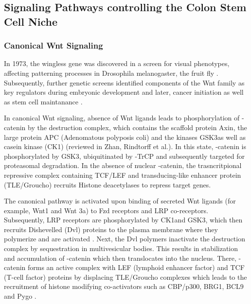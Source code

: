 \begin{flushleft}
\subsection{Signaling Pathways controlling the Colon Stem Cell Niche}
\subsubsection{Canonical Wnt Signaling}
In 1973, the wingless gene was discovered in a screen for visual phenotypes, affecting patterning processes in Drosophila melanogaster, the fruit fly \cite{Sharma1973WinglessMelanogaster.}. Subsequently, further genetic screens identified components of the Wnt family as key regulators during embryonic development and later, cancer initiation as well as stem cell maintanance  \cite{Nusslein-Volhard1980MutationsDrosophila}. \par 

In canonical Wnt signaling, absence of Wnt ligands leads to phosphorylation of \textbeta-catenin by the destruction complex, which contains the scaffold protein Axin, the large protein APC (Adenomatous polyposis coli) and the kinases GSK3\textbeta as well as casein kinase (CK1\textalpha) (reviewed in Zhan, Rindtorff et al.\cite{Zhan2017}). 
In this state, \textbeta-catenin is phosphorylated by GSK3\textbeta, ubiquitinated by \textbeta-TrCP and subsequently targeted for proteasomal degradation. 
In the absence of nuclear \textbeta-catenin, the trasncritpional repressive complex containing TCF/LEF and transducing-like enhancer protein (TLE/Groucho) recruits Histone deacetylases to repress target genes. \par 

The canonical pathway is activated upon binding of secreted Wnt ligands (for example, Wnt1 and Wnt 3a) to Fzd receptors and LRP co-receptors. 
Subsequently, LRP receptors are  phosphorylated by CK1\textalpha and GSK3\textbeta, which then recruits Dishevelled (Dvl) proteins to the plasma membrane where they polymerize and are activated \cite{Metcalfe2011}. Next, the Dvl polymers inactivate the destruction complex by sequestration in multivesicular bodies. This results in stabilization and accumulation of \textbeta-catenin which then translocates into the nucleus. There, \textbeta-catenin forms an active complex with LEF (lymphoid enhancer factor) and TCF (T-cell factor) proteins by displacing TLE/Groucho complexes which leads to the recruitment of histone modifying co-activators such as CBP/p300, BRG1, BCL9 and Pygo \cite{Lien2014WntSignaling}. \par 


\end{flushleft}
